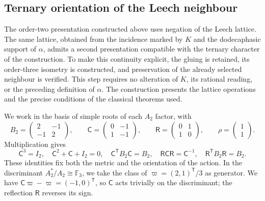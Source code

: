 
\subsection{Ternary orientation of the Leech neighbour}
\label{km:orden-tres-reticular}

The order-two presentation constructed above uses negation
of the Leech lattice. The same lattice, obtained from the incidence marked
by \(K\) and the dodecaphasic support of \(\alpha\), admits a second
presentation compatible with the ternary character of the construction.
To make this continuity explicit, the gluing is retained, its order-three
isometry is constructed, and preservation of the already selected neighbour
is verified. This step requires no alteration of \(K\), its rational reading,
or the preceding definition of \(\alpha\). The construction presents the lattice operations and the precise conditions of the classical theorems used.

We work in the basis of simple roots of each \(A_2\) factor, with
\begin{equation}
 B_2=\begin{pmatrix}2&-1\\-1&2\end{pmatrix},\qquad
 \mathsf C=\begin{pmatrix}0&-1\\1&-1\end{pmatrix},\qquad
 \mathsf R=\begin{pmatrix}0&1\\1&0\end{pmatrix},\qquad
 \rho=\begin{pmatrix}1\\1\end{pmatrix}.
 \label{km:coxeter-reflexion}
\end{equation}
Multiplication gives
\[
 \mathsf C^3=I_2,\quad
 \mathsf C^2+\mathsf C+I_2=0,\quad
 \mathsf C^{\mathsf T}B_2\mathsf C=B_2,\quad
 \mathsf R\mathsf C\mathsf R=\mathsf C^{-1},\quad
 \mathsf R^{\mathsf T}B_2\mathsf R=B_2.
\]
These identities fix both the metric and the orientation of the action.
In the discriminant \(A_2^*/A_2\cong\mathbb F_3\), we take
the class of \(\varpi=(2,1)^{\mathsf T}/3\) as generator. We have
\(\mathsf C\varpi-\varpi=(-1,0)^{\mathsf T}\), so
\(\mathsf C\) acts trivially on the discriminant; the reflection
\(\mathsf R\) reverses its sign.

